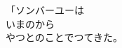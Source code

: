 \documentclass[
a4paper,
fontsize=20pt,
jafontsize=20pt,
book]
{tarticle}
\begin{document}
「ソンバーユーは\\
いまのから\\
やつとのことでつてきた。\\
\begin{comment}
\ruby[g]{勇}{いさ}ましい\ruby[g]{凱旋}{がいせん}だと\ruby[g]{云}{い}ひたいが
\ruby[g]{実}{じつ}はすつかり\ruby[g]{参}{まい}つて\ruby[g]{来}{き}たのだ
とにかくあすこは\ruby[g]{寒}{さむ}い\ruby[g]{処}{ところ}さ。
\ruby[g]{三十年}{さんじゅうねん}と\ruby[g]{いふ}{いう}\ruby[g]{黄}{き}いろなむかし
おれは\ruby[g]{十万}{じゅうまん}の\ruby[g]{軍勢}{ぐんぜい}をひき\ruby{ゐ}{い}
この\ruby{門}{もん}をくぐつて\ruby[g]{威}{い}\ruby[g]{張}{ば}つて\ruby[g]{行}{い}つた。
それからどうだもう\ruby[g]{見}{み}るものは\ruby[g]{空}{そら}ばかり
\ruby[g]{風}{かぜ}は\ruby[g]{乾}{かわ}いて\ruby[g]{砂}{すな}を\ruby[g]{吹}{ふ}き
\ruby[g]{雁}{かり}さへ\ruby[g]{干}{ほ}せてたびたび\ruby[g]{落}{おと}ちた
おれはその\ruby{間}{あいだ} \ruby[g]{馬}{うま}でかけ\ruby[g]{通}{とお}し
\ruby[g]{馬}{うま}がつかれてたびたびペタンと\ruby[g]{座}{すわ}り
\ruby[g]{涙}{なみだ}をためてはじつと\ruby[g]{遠}{とお}くの\ruby[g]{砂}{すな}を\ruby[g]{見}{み}た。
その\ruby{度}{たび}ごとにおれは\ruby{鎧}{よろい}のかくしから
\ruby{塩}{しお}をすこうし\ruby[g]{取}{と}り\ruby{出}{だ}して
\ruby{馬}{うま}に\ruby[g]{嘗}{な}めさせては\ruby[g]{元気}{げんき}をつけた。
その\ruby{馬}{うま}も\ruby[g]{今}{いま}では\ruby[g]{三十五歳}{さんじゅうごさい}
\ruby[g]{五里}{ごり}かけるにも\ruby[g]{四時間}{よじかん}かゝる
それからおれはもう\ruby[g]{七十}{しちじゅう}だ。
とても\ruby{帰}{かえ}れまいと\ruby[g]{思}{おも}つて\ruby{ゐ}{い}たが
ありがたや\ruby[g]{敵}{てき}が\ruby[g]{残}{のこ}らず\ruby[g]{脚気}{かっけ}で\ruby[g]{死}{し}んだ
\ruby[g]{今年}{ことし}の\ruby[g]{夏}{なつ}はへんに\ruby[g]{湿気}{しっけ}が\ruby[g]{多}{おお}かつたでな。
それに\ruby[g]{脚気}{かっけ}の\ruby[g]{原因}{げんいん}が
あんまりこつちを\ruby[g]{追}{お}ひかけて
\ruby[g]{砂}{すな}を\ruby[g]{走}{はし}つたためなんだ
さうしてみればどうだやつぱり\ruby[g]{凱旋}{がいせん}だらう。
\ruby[g]{殊}{こと}にも\ruby[g]{一}{ひと}つほめられて\ruby[g]{いゝ}{いい}ことは
\ruby[g]{十万人}{じゅうまんにん}もでかけたものが
\ruby[g]{九万人}{きゅうまんにん}まで\ruby[g]{戻}{もど}つて\ruby[g]{来た}{き  }。
\ruby[g]{死}{しん}だやつらは\ruby[g]{気}{き}の\ruby[g]{毒}{どく}だが
\ruby[g]{三十年}{さんじゅうねん}の\ruby{間}{あいだ}には
たとへいくさに\ruby[g]{行}{い}かなくたつて
\ruby[g]{一割}{いちわり}ぐら\ruby{ゐ}{い}は\ruby[g]{死}{し}ぬんぢやないか。
そこでラユーのむかしのともよ
またこどもらよきやうだいよ
\ruby[g]{北守}{ほくしゅ}\ruby[g]{将軍}{しょうぐん}ソンバーユーと
その\ruby[g]{軍勢}{ぐんぜい}が\ruby[g]{帰}{かえ}つたのだ
\ruby{門}{もん}をあけてもいゝではないか。」
 


\end{comment}
\end{document}
